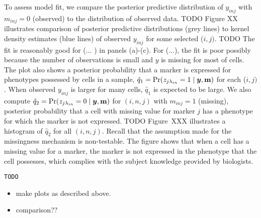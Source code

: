 \documentclass[12pt,]{article}
\def\Prob{\text{Pr}}
\newcommand{\by}{\mbox{\boldmath $y$}}
\begin{document}


To assess model fit, we compare the posterior predictive distribution of
$y_{inj}$ with $m_{inj}=0$ (observed) to the distribution of observed data.
TODO
Figure XX 
illustrates comparison of posterior predictive distributions (grey
lines) to kernel density estimates (blue lines) of observed $y_{inj}$ for some
selected ($i,j)$.
TODO
The fit is  reasonably good for (... ) in panels (a)-(c).
For (...), the fit is poor possibly because the number of observations is small
%
%
and $y$ is missing for most of cells.  The plot also shows a posterior
probability that a marker is expressed for phenotypes possessed by cells in a
sample, $\hat{q}_1=\Prob(z_{j \lambda_{in}}=1 \mid \by, \bf m)$ for each
($i,j)$. When observed $y_{inj}$ is larger for many cells, $\hat{q}_1$ is
expected to be large.  We also compute $\hat{q}_2=\Prob(z_{j \lambda_{in}}=0
\mid \by, \bf m)$ for $(i,n,j)$ with $m_{inj}=1$ (missing), posterior
probability that a cell with missing value for marker $j$ has a phenotype for
which the marker is not expressed. 
TODO
Figure~XXX 
%
illustrates a histogram of $\hat{q}_2$ for all $(i, n, j)$.  Recall that the
assumption made for the missingness mechanism is non-testable.   The figure
shows that when a cell has a missing value for a marker, the marker is not
expressed in the phenotype that the cell possesses, which complies with the
subject knowledge provided by biologists.  



{\tt  TODO
\begin{itemize}
\item make plots as described above.
\item comparison??
\end{itemize} }




\end{document}
